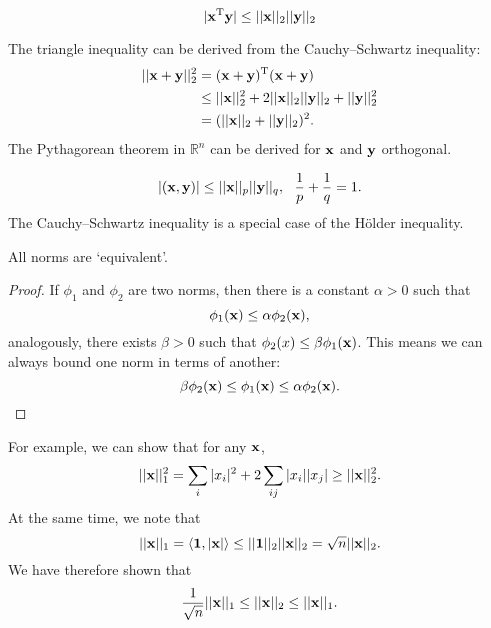 \documentclass{article}
\begin{document}
\begin{definition}
    \begin{equation}
        |\bm{\mathrm{x}}^{\text{T}}\bm{\mathrm{y}}|\leq ||\bm{\mathrm{x}}||_2||\bm{\mathrm{y}}||_2
    \end{equation}
\end{definition}

The triangle inequality can be derived from the Cauchy--Schwartz inequality:
\begin{align}
    ||\bm{\mathrm{x}}+\bm{\mathrm{y}}||_2^2&=(\bm{\mathrm{x}}+\bm{\mathrm{y}})^{\text{T}}(\bm{\mathrm{x}}+\bm{\mathrm{y}})\\
    &\leq||\bm{\mathrm{x}}||_2^2+2||\bm{\mathrm{x}}||_2||\bm{\mathrm{y}}||_2+||\bm{\mathrm{y}}||_2^2\\
    &=(||\bm{\mathrm{x}}||_2+||\bm{\mathrm{y}}||_2)^2.
\end{align}
The Pythagorean theorem in $\mathbb{R}^n$ can be derived for $\bm{\mathrm{x}}$ and $\bm{\mathrm{y}}$ orthogonal.

\begin{definition}
    \begin{equation}
        |(\bm{\mathrm{x}},\bm{\mathrm{y}})|\leq ||\bm{\mathrm{x}}||_p||\bm{\mathrm{y}}||_q,\ \ \frac{1}{p}+\frac{1}{q}=1.
    \end{equation}
    The Cauchy--Schwartz inequality is a special case of the H{\"o}lder inequality.
\end{definition}

\begin{theorem}
    All norms are `equivalent'.
\end{theorem}
\begin{proof}
    If $\phi_1$ and $\phi_2$ are two norms, then there is a constant $\alpha>0 $ such that
    \begin{equation}
        \phi_1(\bm{\mathrm{x}})\leq\alpha\phi_2(\bm{\mathrm{x}}),
    \end{equation}
    analogously, there exists $\beta>0$ such that $\phi_2(x)\leq\beta\phi_1(\bm{\mathrm{x}})$. This means we can always bound one norm in terms of another:
    \begin{equation}
        \beta\phi_2(\bm{\mathrm{x}})\leq\phi_1(\bm{\mathrm{x}})\leq\alpha\phi_2(\bm{\mathrm{x}}).
    \end{equation}
\end{proof}
For example, we can show that for any $\bm{\mathrm{x}}$,
\begin{equation}
    ||\bm{\mathrm{x}}||_1^2=\sum_{i}|x_i|^2+2\sum_{ij}|x_i||x_j|\geq ||\bm{\mathrm{x}}||_2^2.
\end{equation}
At the same time, we note that 
\begin{equation}
    ||\bm{\mathrm{x}}||_1=\langle\bm{\mathrm{1}},|\bm{\mathrm{x}}|\rangle\leq ||\bm{\mathrm{1}}||_2||\bm{\mathrm{x}}||_2=\sqrt{n}||\bm{\mathrm{x}}||_2.
\end{equation}
We have therefore shown that
\begin{equation}
    \frac{1}{\sqrt{n}}||\bm{\mathrm{x}}||_1\leq||\bm{\mathrm{x}}||_2\leq||\bm{\mathrm{x}}||_1.
\end{equation}
\end{document}
